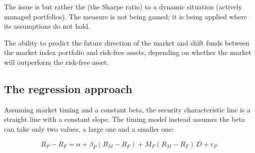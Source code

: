 \begin{imkeybox}[title={The distinction the notes are careful about}]
The issue is  but rather the
 (the Sharpe ratio) to a dynamic
situation (actively managed portfolios). The measure is not being gamed; it is
being applied where its assumptions do not hold.
\end{imkeybox}


\begin{imdefbox}[title={Market timing}]
The ability to predict the future direction of the market and shift funds between
the market index portfolio and risk-free assets, depending on whether the market
will outperform the risk-free asset.
\end{imdefbox}

\subsection{The regression approach}

Assuming  market timing and a constant beta, the security characteristic
line is a straight line with a constant slope. The timing model instead assumes
the beta can take only two values, a large one and a smaller one:

\begin{imfmlbox}
\[ R_P - R_F = \alpha + \beta_P (R_M - R_F) + M_P (R_M - R_F)\,D + \varepsilon_P \]
\end{imfmlbox}

